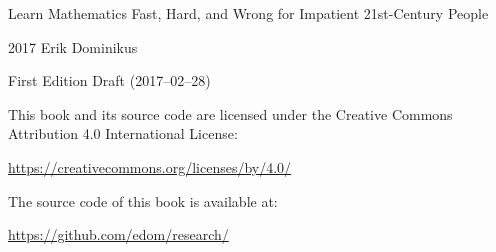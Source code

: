{
    \setlength\parindent{0em}
    Learn Mathematics Fast, Hard, and Wrong for Impatient 21st-Century People\par\vspace{1em}
    \textcopyright{} 2017 Erik Dominikus\par\vspace{1em}
    First Edition Draft (2017--02--28)\par\vspace{1em}
    \vspace{2em}
    This book and its source code are licensed under the Creative Commons Attribution 4.0 International License:\par\vspace{1em}
    \url{https://creativecommons.org/licenses/by/4.0/}\par\vspace{1em}
    \vspace{2em}
    The source code of this book is available at:\par\vspace{1em}
    \url{https://github.com/edom/research/}\par
}
